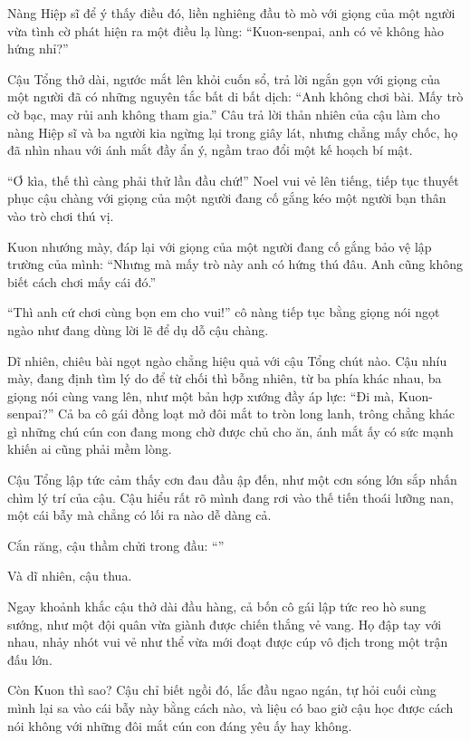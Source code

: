 \documentclass[../main.tex]{subfiles}
\begin{document}

Nàng Hiệp sĩ để ý thấy điều đó, liền nghiêng đầu tò mò với giọng của một người vừa tình cờ phát hiện ra một điều lạ lùng: ``Kuon-senpai, anh có vẻ không hào hứng nhỉ?''

Cậu Tổng thở dài, ngước mắt lên khỏi cuốn sổ, trả lời ngắn gọn với giọng của một người đã có những nguyên tắc bất di bất dịch: ``Anh không chơi bài. Mấy trò cờ bạc, may rủi anh không tham gia.'' Câu trả lời thản nhiên của cậu làm cho nàng Hiệp sĩ và ba người kia ngừng lại trong giây lát, nhưng chẳng mấy chốc, họ đã nhìn nhau với ánh mắt đầy ẩn ý, ngầm trao đổi một kế hoạch bí mật.

``Ơ kìa, thế thì càng phải thử lần đầu chứ!'' Noel vui vẻ lên tiếng, tiếp tục thuyết phục cậu chàng với giọng của một người đang cố gắng kéo một người bạn thân vào trò chơi thú vị.

Kuon nhướng mày, đáp lại với giọng của một người đang cố gắng bảo vệ lập trường của mình: ``Nhưng mà mấy trò này anh có hứng thú đâu. Anh cũng không biết cách chơi mấy cái đó.''

``Thì anh cứ chơi cùng bọn em cho vui!'' cô nàng tiếp tục bằng giọng nói ngọt ngào như đang dùng lời lẽ để dụ dỗ cậu chàng.

Dĩ nhiên, chiêu bài ngọt ngào chẳng hiệu quả với cậu Tổng chút nào. Cậu nhíu mày, đang định tìm lý do để từ chối thì bỗng nhiên, từ ba phía khác nhau, ba giọng nói cùng vang lên, như một bản hợp xướng đầy áp lực: ``Đi mà, Kuon-senpai?'' Cả ba cô gái đồng loạt mở đôi mắt to tròn long lanh, trông chẳng khác gì những chú cún con đang mong chờ được chủ cho ăn, ánh mắt ấy có sức mạnh khiến ai cũng phải mềm lòng.

Cậu Tổng lập tức cảm thấy cơn đau đầu ập đến, như một cơn sóng lớn sắp nhấn chìm lý trí của cậu. Cậu hiểu rất rõ mình đang rơi vào thế tiến thoái lưỡng nan, một cái bẫy mà chẳng có lối ra nào dễ dàng cả.

Cắn răng, cậu thầm chửi trong đầu: ``\textit{}''

Và dĩ nhiên, cậu thua.

Ngay khoảnh khắc cậu thở dài đầu hàng, cả bốn cô gái lập tức reo hò sung sướng, như một đội quân vừa giành được chiến thắng vẻ vang. Họ đập tay với nhau, nhảy nhót vui vẻ như thể vừa mới đoạt được cúp vô địch trong một trận đấu lớn.

Còn Kuon thì sao? Cậu chỉ biết ngồi đó, lắc đầu ngao ngán, tự hỏi cuối cùng mình lại sa vào cái bẫy này bằng cách nào, và liệu có bao giờ cậu học được cách nói không với những đôi mắt cún con đáng yêu ấy hay không.
\end{document}
